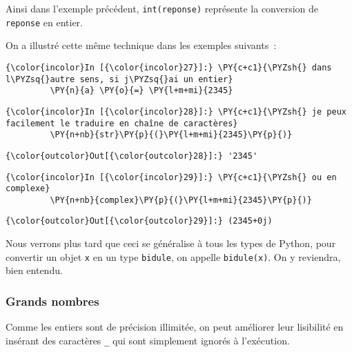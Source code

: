Ainsi dans l'exemple précédent, \texttt{int(reponse)} représente la
conversion de \texttt{reponse} en entier.

On a illustré cette même technique dans les exemples suivants~:

    \begin{Verbatim}[commandchars=\\\{\}]
{\color{incolor}In [{\color{incolor}27}]:} \PY{c+c1}{\PYZsh{} dans l\PYZsq{}autre sens, si j\PYZsq{}ai un entier}
         \PY{n}{a} \PY{o}{=} \PY{l+m+mi}{2345}
\end{Verbatim}


    \begin{Verbatim}[commandchars=\\\{\}]
{\color{incolor}In [{\color{incolor}28}]:} \PY{c+c1}{\PYZsh{} je peux facilement le traduire en chaîne de caractères}
         \PY{n+nb}{str}\PY{p}{(}\PY{l+m+mi}{2345}\PY{p}{)}
\end{Verbatim}


\begin{Verbatim}[commandchars=\\\{\}]
{\color{outcolor}Out[{\color{outcolor}28}]:} '2345'
\end{Verbatim}
            
    \begin{Verbatim}[commandchars=\\\{\}]
{\color{incolor}In [{\color{incolor}29}]:} \PY{c+c1}{\PYZsh{} ou en complexe}
         \PY{n+nb}{complex}\PY{p}{(}\PY{l+m+mi}{2345}\PY{p}{)}
\end{Verbatim}


\begin{Verbatim}[commandchars=\\\{\}]
{\color{outcolor}Out[{\color{outcolor}29}]:} (2345+0j)
\end{Verbatim}
            
    Nous verrons plus tard que ceci se généralise à tous les types de
Python, pour convertir un objet \texttt{x} en un type \texttt{bidule},
on appelle \texttt{bidule(x)}. On y reviendra, bien entendu.

    \hypertarget{grands-nombres}{%
\subsubsection{Grands nombres}\label{grands-nombres}}

    Comme les entiers sont de précision illimitée, on peut améliorer leur
lisibilité en insérant des caractères \texttt{\_} qui sont simplement
ignorés à l'exécution.

